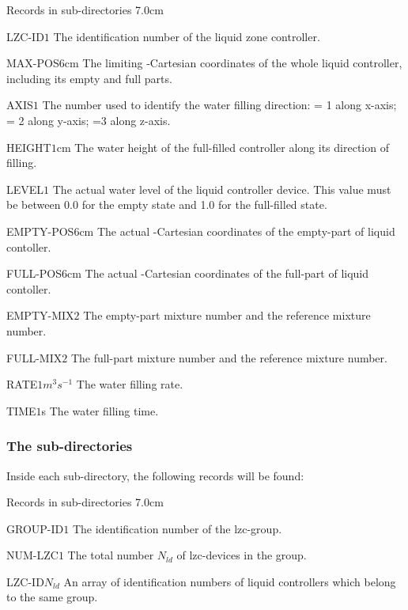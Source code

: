 \begin{DescriptionEnregistrement}{Records in  sub-directories}
{7.0cm} \label{tabl:tablzc}

\IntEnr
{LZC-ID}{$1$}
{The identification number of the liquid zone controller.}

\RealEnr
{MAX-POS}{$6$}{cm}
{The limiting -Cartesian coordinates of the whole liquid
 controller, including its empty and full parts.}

\IntEnr
{AXIS}{$1$}
{The number used to identify the water filling direction:
 = 1 along x-axis; = 2 along y-axis; =3 along z-axis.}

\RealEnr
{HEIGHT}{$1$}{cm}
{The water height of the full-filled controller along its direction of filling.}

\RealEnr
{LEVEL}{$1$}{}
{The actual water level of the liquid controller device. This value must
 be between 0.0 for the empty state and 1.0 for the full-filled state.}

\RealEnr
{EMPTY-POS}{$6$}{cm}
{The actual -Cartesian coordinates of the empty-part
 of liquid contoller.}

\RealEnr
{FULL-POS}{$6$}{cm}
{The actual -Cartesian coordinates of the full-part
 of liquid contoller.}

\IntEnr
{EMPTY-MIX}{$2$}
{The empty-part mixture number and the reference mixture number.}

\IntEnr
{FULL-MIX}{$2$}
{The full-part mixture number and the reference mixture number.}

\RealEnr
{RATE}{$1$}{$m^3 s^{-1}$}
{The water filling rate.}

\RealEnr
{TIME}{$1$}{s}
{The water filling time.}

\end{DescriptionEnregistrement}

\subsubsection{The  sub-directories}\label{sect:lzcgroup}

\noindent
Inside each  sub-directory, the following records will be found:

\begin{DescriptionEnregistrement}{Records in  sub-directories}
{7.0cm} \label{tabl:tablzcgroup}
 
\IntEnr
{GROUP-ID}{$1$}
{The identification number of the lzc-group.}

\IntEnr
{NUM-LZC}{$1$}
{The total number $N_{ld}$ of lzc-devices in the group.}

\IntEnr
{LZC-ID}{$N_{ld}$}
{An array of identification numbers of liquid controllers which belong to the same group.}

\end{DescriptionEnregistrement}
